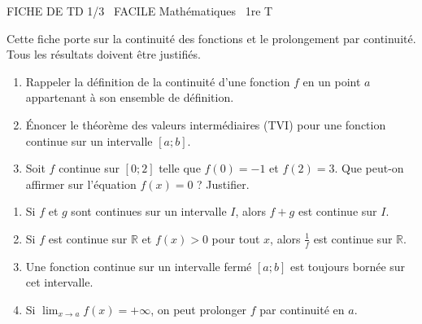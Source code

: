 \documentclass[11pt]{article}
\begin{document}
\begin{tcolorbox}[enhanced,colback=popink,colframe=popink,arc=10pt,boxrule=0pt,left=12pt,right=12pt,top=9pt,bottom=9pt]
{\color{white}\popxbold\small FICHE DE TD 1/3 \textbullet\ FACILE \hfill Mathématiques \textbullet\ 1re T\par}
\end{tcolorbox}
\vspace{4pt}
Cette fiche porte sur la continuité des fonctions et le prolongement par continuité. Tous les résultats doivent être justifiés.

\begin{exercice}
\begin{enumerate}
    \item Rappeler la définition de la continuité d'une fonction $f$ en un point $a$ appartenant à son ensemble de définition.
    \item Énoncer le théorème des valeurs intermédiaires (TVI) pour une fonction continue sur un intervalle $[a;b]$.
    \item Soit $f$ continue sur $[0;2]$ telle que $f(0)=-1$ et $f(2)=3$. Que peut-on affirmer sur l'équation $f(x)=0$ ? Justifier.
\end{enumerate}
\end{exercice}

\begin{exercice}
\begin{enumerate}
    \item Si $f$ et $g$ sont continues sur un intervalle $I$, alors $f+g$ est continue sur $I$.
    \item Si $f$ est continue sur $\mathbb{R}$ et $f(x)>0$ pour tout $x$, alors $\frac{1}{f}$ est continue sur $\mathbb{R}$.
    \item Une fonction continue sur un intervalle fermé $[a;b]$ est toujours bornée sur cet intervalle.
    \item Si $\lim_{x\to a} f(x) = +\infty$, on peut prolonger $f$ par continuité en $a$.
\end{enumerate}
\end{exercice}
\end{document}
